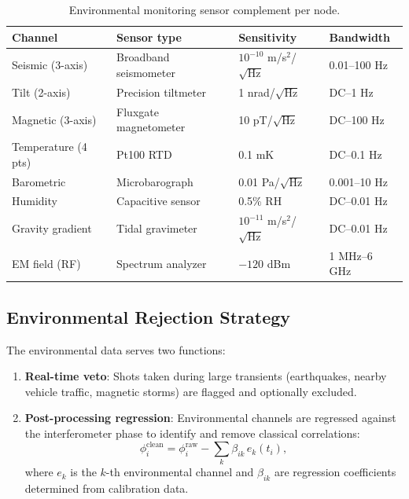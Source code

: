 \documentclass[12pt,a4paper]{article}
\begin{document}
\begin{table}[H]
\centering
\small
\begin{tabular}{llll}
\toprule
\textbf{Channel} & \textbf{Sensor type} & \textbf{Sensitivity} & \textbf{Bandwidth} \\
\midrule
Seismic (3-axis) & Broadband seismometer & $10^{-10}$ m/s$^2$/$\sqrt{\text{Hz}}$ & 0.01--100 Hz \\
Tilt (2-axis) & Precision tiltmeter & 1 nrad/$\sqrt{\text{Hz}}$ & DC--1 Hz \\
Magnetic (3-axis) & Fluxgate magnetometer & 10 pT/$\sqrt{\text{Hz}}$ & DC--100 Hz \\
Temperature (4 pts) & Pt100 RTD & 0.1 mK & DC--0.1 Hz \\
Barometric & Microbarograph & 0.01 Pa/$\sqrt{\text{Hz}}$ & 0.001--10 Hz \\
Humidity & Capacitive sensor & 0.5\% RH & DC--0.01 Hz \\
Gravity gradient & Tidal gravimeter & $10^{-11}$ m/s$^2$/$\sqrt{\text{Hz}}$ & DC--0.01 Hz \\
EM field (RF) & Spectrum analyzer & $-120$ dBm & 1 MHz--6 GHz \\
\bottomrule
\end{tabular}
\caption{Environmental monitoring sensor complement per node.}
\label{tab:env-sensors}
\end{table}

\subsection{Environmental Rejection Strategy}

The environmental data serves two functions:
\begin{enumerate}
\item \textbf{Real-time veto}: Shots taken during large transients
(earthquakes, nearby vehicle traffic, magnetic storms) are flagged
and optionally excluded.
\item \textbf{Post-processing regression}: Environmental channels are
regressed against the interferometer phase to identify and remove
classical correlations:
\begin{equation}
\phi_i^{\text{clean}} = \phi_i^{\text{raw}} - \sum_k \beta_{ik}\,e_k(t_i),
\end{equation}
where $e_k$ is the $k$-th environmental channel and $\beta_{ik}$ are
regression coefficients determined from calibration data.
\end{enumerate}
\end{document}
